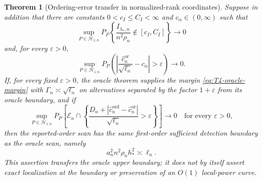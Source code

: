 \documentclass[11pt]{article}
\newtheorem{theorem}{Theorem}[section]
\theoremstyle{definition}
\newcommand{\1}{\mathbf 1}\newcommand{\op}{\operatorname}
\begin{document}
\begin{theorem}[Ordering-error transfer in normalized-rank coordinates]
Suppose in addition that there are constants
$0<c_I\le C_I<\infty$ and $c_\alpha\in(0,\infty)$ such that
\begin{equation}
 \sup_{P\in\mathcal H_{1,n}}
 P_P\!\left\{
  \frac{I_{\lambda_*,n}}{n^2\rho_n}\notin[c_I,C_I]
 \right\}\to0
 \label{eq:T4-information-critical-scaling}
\end{equation}
and, for every $\varepsilon>0$,
\begin{equation}
 \sup_{P\in\mathcal H_{1,n}}
 P_P\!\left(
  \left|
   \frac{\widehat c_n^{\mathrm{or}}}{\sqrt{\ell_n}}-c_\alpha
  \right|>\varepsilon
 \right)\to0.
 \label{eq:T4-critical-scaling}
\end{equation}
If, for every fixed $\varepsilon>0$, the
oracle theorem supplies the margin \eqref{eq:T4-oracle-margin} with
$\Gamma_n\asymp\sqrt{\ell_n}$ on alternatives separated by the
factor $1+\varepsilon$ from its oracle boundary, and if
\begin{equation}
 \sup_{P\in\mathcal H_{1,n}}
 P_P\!\left[
  \mathcal E_n\cap
  \left\{
   \frac{D_n+|\widehat c_n^{\mathrm{ord}}
                     -\widehat c_n^{\mathrm{or}}|}
        {\sqrt{\ell_n}}>\varepsilon
  \right\}
 \right]\to0
 \quad\text{for every }\varepsilon>0,
 \label{eq:T4-first-order-rate}
\end{equation}
then the reported-order scan has the same first-order sufficient
detection boundary as the oracle scan, namely
\begin{equation}
 a_n^2n^2\rho_nh_*^2\asymp\ell_n.
 \label{eq:T4-detection-boundary}
\end{equation}
This assertion transfers the oracle upper boundary; it does not by
itself assert exact localization at the boundary or preservation of
an $O(1)$ local-power curve.


\end{theorem}
\end{document}

